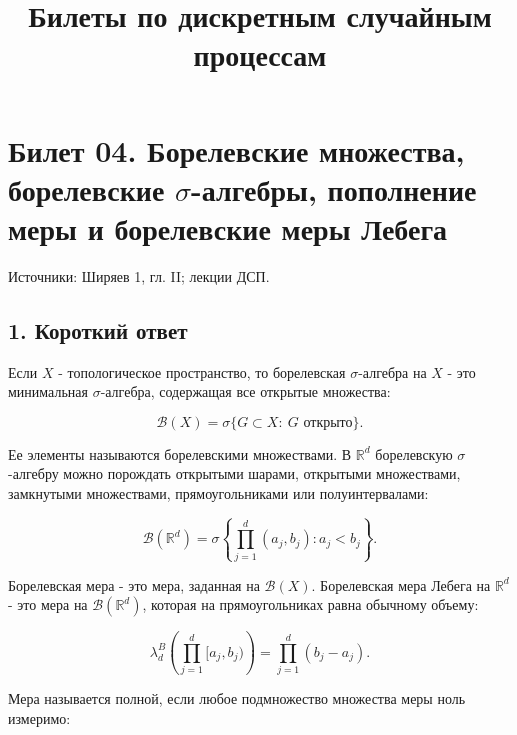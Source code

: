 \documentclass[
  11pt,
  a4paper,
]{article}
\title{Билеты по дискретным случайным процессам}
\author{}
\date{}
\begin{document}
\maketitle

\section{\texorpdfstring{Билет 04. Борелевские множества, борелевские
\(\sigma\)-алгебры, пополнение меры и борелевские меры
Лебега}{Билет 04. Борелевские множества, борелевские \textbackslash sigma-алгебры, пополнение меры и борелевские меры Лебега}}\label{ux431ux438ux43bux435ux442-04.-ux431ux43eux440ux435ux43bux435ux432ux441ux43aux438ux435-ux43cux43dux43eux436ux435ux441ux442ux432ux430-ux431ux43eux440ux435ux43bux435ux432ux441ux43aux438ux435-sigma-ux430ux43bux433ux435ux431ux440ux44b-ux43fux43eux43fux43eux43bux43dux435ux43dux438ux435-ux43cux435ux440ux44b-ux438-ux431ux43eux440ux435ux43bux435ux432ux441ux43aux438ux435-ux43cux435ux440ux44b-ux43bux435ux431ux435ux433ux430}

Источники: Ширяев 1, гл. II; лекции ДСП.

\subsection{1. Короткий
ответ}\label{ux43aux43eux440ux43eux442ux43aux438ux439-ux43eux442ux432ux435ux442}

Если \(X\) - топологическое пространство, то борелевская
\(\sigma\)-алгебра на \(X\) - это минимальная \(\sigma\)-алгебра,
содержащая все открытые множества:

\[
\mathcal B(X)=\sigma\{G\subset X:\ G\text{ открыто}\}.
\]

Ее элементы называются борелевскими множествами. В \(\mathbb R^d\)
борелевскую \(\sigma\)-алгебру можно порождать открытыми шарами,
открытыми множествами, замкнутыми множествами, прямоугольниками или
полуинтервалами:

\[
\mathcal B(\mathbb R^d)
=
\sigma\left\{\prod_{j=1}^d(a_j,b_j):a_j<b_j\right\}.
\]

Борелевская мера - это мера, заданная на \(\mathcal B(X)\). Борелевская
мера Лебега на \(\mathbb R^d\) - это мера на
\(\mathcal B(\mathbb R^d)\), которая на прямоугольниках равна обычному
объему:

\[
\lambda_d^B\left(\prod_{j=1}^d[a_j,b_j)\right)
=
\prod_{j=1}^d(b_j-a_j).
\]

Мера называется полной, если любое подмножество множества меры ноль
измеримо:
\end{document}
